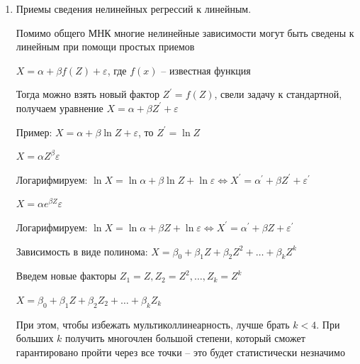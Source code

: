 \begin{enumerate}
    Недостаток у этого метода: нужно знать коэффициенты $v_i$

    \Ex Рассмотрим модель линейной парной регрессии без свободного члена $X = \beta_0 Z + \varepsilon$

    Теоретическое уравнение $A \vec B = Z \vec X$, где $Z = \left(Z_1, \dots, Z_n\right)$ -- матрица плана, $\vec B = \hat \beta_0$, $A = Z Z^T = z_1^2 + \dots + z_n^2$, $Z \vec X = z_1 x_1 + \dots + z_n x_n$

    $\sum_{i = 1}^n z^2_i \hat \beta_0 = \sum_{i = 1}^n z_i x_i \Longrightarrow \hat \beta_0 = \frac{\sum_{z_i x_i}}{\sum z^2_i}$ -- оценка МНК 

    По взвешенному методу наименьших квадратов $\tilde \beta_0 = \frac{\sum w_i z_i x_i}{\sum w_i z_i^2}$ -- оценка взвешенного МНК

    \item Приемы сведения нелинейных регрессий к линейным.

    Помимо общего МНК многие нелинейные зависимости могут быть сведены к линейным при помощи простых приемов

     $X = \alpha + \beta f(Z) + \varepsilon$, где $f(x)$ -- известная функция

    Тогда можно взять новый фактор $Z^\prime = f(Z)$, свели задачу к стандартной, получаем уравнение $X = \alpha + \beta Z^\prime + \varepsilon$

    Пример: $X = \alpha + \beta \ln Z + \varepsilon$, то $Z^\prime = \ln Z$

     $X = \alpha Z^\beta \varepsilon$

    Логарифмируем: $\ln X = \ln \alpha + \beta \ln Z + \ln \varepsilon \Longleftrightarrow X^\prime = \alpha^\prime + \beta Z^\prime + \varepsilon^\prime$

     $X = \alpha e^{\beta Z} \varepsilon$

    Логарифмируем: $\ln X = \ln \alpha + \beta Z + \ln \varepsilon \Longleftrightarrow X^\prime = \alpha^\prime + \beta Z + \varepsilon^\prime$

     Зависимость в виде полинома: $X = \beta_0 + \beta_1 Z + \beta_2 Z^2 + \dots + \beta_k Z^k$

    Введем новые факторы $Z_1 = Z, Z_2 = Z^2, \dots, Z_k = Z^k$

    $X = \beta_0 + \beta_1 Z + \beta_2 Z_2 + \dots + \beta_k Z_k$

    При этом, чтобы избежать мультиколлинеарность, лучше брать $k < 4$. При больших $k$ получить многочлен большой степени, который сможет гарантировано пройти через все точки -- это будет статистически незначимо


\end{enumerate}
